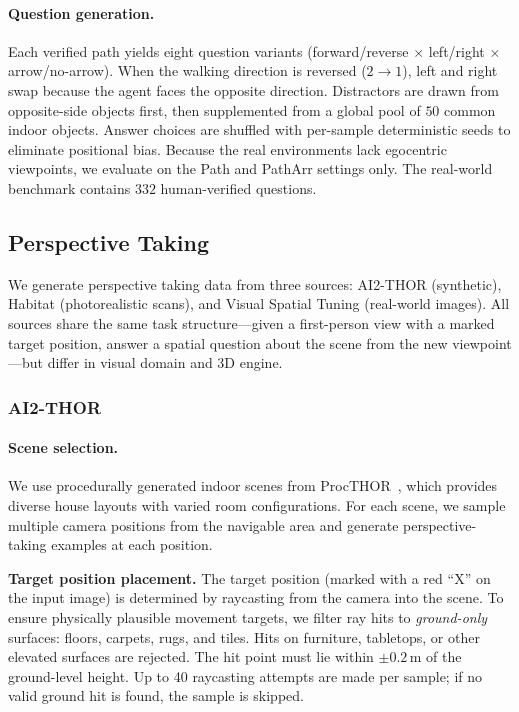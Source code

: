 \paragraph{Question generation.}
Each verified path yields eight question variants (forward/reverse $\times$ left/right $\times$ arrow/no-arrow).
When the walking direction is reversed ($2 \to 1$), left and right swap because the agent faces the opposite direction.
Distractors are drawn from opposite-side objects first, then supplemented from a global pool of $50$ common indoor objects.
Answer choices are shuffled with per-sample deterministic seeds to eliminate positional bias.
Because the real environments lack egocentric viewpoints, we evaluate on the Path and PathArr settings only.
The real-world benchmark contains $332$ human-verified questions.

\subsection{Perspective Taking}
\label{supp_data_pet}

We generate perspective taking data from three sources: AI2-THOR (synthetic), Habitat (photorealistic scans), and Visual Spatial Tuning (real-world images).
All sources share the same task structure---given a first-person view with a marked target position, answer a spatial question about the scene from the new viewpoint---but differ in visual domain and 3D engine.

\subsubsection{AI2-THOR}

\paragraph{Scene selection.}
We use procedurally generated indoor scenes from ProcTHOR~\cite{deitke2022procthor}, which provides diverse house layouts with varied room configurations.
For each scene, we sample multiple camera positions from the navigable area and generate perspective-taking examples at each position.

\noindent\textbf{Target position placement.}
The target position (marked with a red ``X'' on the input image) is determined by raycasting from the camera into the scene.
To ensure physically plausible movement targets, we filter ray hits to \emph{ground-only} surfaces: floors, carpets, rugs, and tiles.
Hits on furniture, tabletops, or other elevated surfaces are rejected.
The hit point must lie within $\pm0.2$\,m of the ground-level height.
Up to 40 raycasting attempts are made per sample; if no valid ground hit is found, the sample is skipped.

